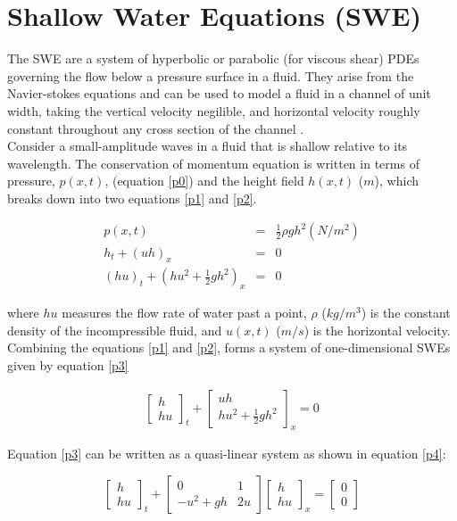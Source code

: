 \documentclass[12pt,a4paper]{article}
\begin{document}
	
	\section{Shallow Water Equations (SWE)}
	The SWE are a system of hyperbolic or parabolic (for viscous shear) PDEs governing the flow below a pressure surface in a fluid. They arise from the Navier-stokes equations and can be used to model a fluid in a channel of unit width, taking the vertical velocity negilible, and horizontal velocity roughly constant throughout any cross section of the channel \cite{ge:2008}.  \\
	
	\noindent Consider a small-amplitude waves in a fluid that is shallow relative to its wavelength. The conservation of momentum equation is written in terms of pressure, $p(x,t)$, (equation \eqref{p0}) and the height field $h(x,t)$ ($m$), which breaks down into two equations \eqref{p1} and \eqref{p2}.

	\begin{eqnarray}
			p(x,t)& =& \frac{1}{2}\rho gh^{2} (N/m^{2}) 
		\label{p0}\\
		h_{t} + (uh)_x &=& 0
		\label{p1} \\
		(hu)_t + \left(hu^{2} + \frac{1}{2}gh^{2} \right)_x &=& 0
		\label{p2}
	\end{eqnarray}
	
	\noindent where $hu$ measures the flow rate of water past a point,  $\rho$ ($kg/m^3$) is the constant density of the incompressible fluid, and $u(x,t)$ ($m/s$) is the horizontal velocity.\\
	
	\noindent	Combining the equations \eqref{p1} and \eqref{p2}, forms a system of one-dimensional SWEs given by equation \eqref{p3}
	
	\begin{eqnarray}
		\begin{bmatrix} h \\ hu \end{bmatrix}_t + \begin{bmatrix} uh \\ hu^{2} + \frac{1}{2} gh^{2} \end{bmatrix}_x  = 0 
		\label{p3}
	\end{eqnarray}
	
	\noindent Equation \eqref{p3} can be written as a quasi-linear system as shown in equation \eqref{p4}:
	
	\begin{equation}
		\begin{bmatrix} h \\ hu \end{bmatrix}_t + 
		\begin{bmatrix} 0 &  1 \\ -u^{2} + gh & 2u \end{bmatrix} 
		\begin{bmatrix} h \\ hu \end{bmatrix}_x =  
		\begin{bmatrix} 0 \\ 0 \end{bmatrix}
		\label{p4}
	\end{equation}
	
\end{document}
